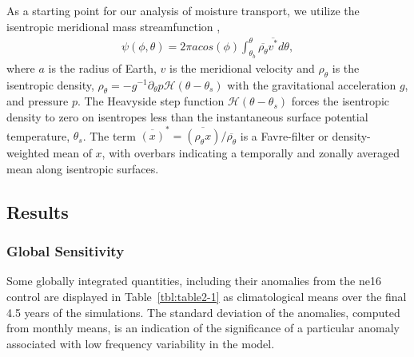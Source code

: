 As a starting point for our analysis of moisture transport, we utilize the isentropic meridional mass streamfunction \citep{HS1999JAS,SETAL2006JCLIM},
\begin{eqnarray}
\psi (\phi,\theta) = 2 \pi a cos(\phi) \int_{\theta_{b}}^{\theta} \overline{\rho_{\theta}} \overline{v^{\ast}} d\theta, \label{eq:eq2-1}
\end{eqnarray}
where $a$ is the radius of Earth, $v$ is the meridional velocity and $\rho_{\theta}$ is the isentropic density, $\rho_{\theta} = -g^{-1} \partial_{\theta} p \mathcal{H}(\theta - \theta_s)$ with the gravitational acceleration $g$, and pressure $p$. The Heavyside step function $\mathcal{H}(\theta - \theta_s)$ forces the isentropic density to zero on isentropes less than the instantaneous surface potential temperature, $\theta_s$. The term $\overline{(x)}^{\ast} = \overline{(\rho_{\theta} x)}/\overline{\rho_{\theta}}$ is a Favre-filter or density-weighted mean of $x$, with overbars indicating a temporally and zonally averaged mean along isentropic surfaces.

\subsection{Results}
\subsubsection{Global Sensitivity}
Some globally integrated quantities, including their anomalies from the ne16 control are displayed in Table~\ref{tbl:table2-1} as climatological means over the final 4.5 years of the simulations. The standard deviation of the anomalies, computed from monthly means, is an indication of the significance of a particular anomaly associated with low frequency variability in the model. 

